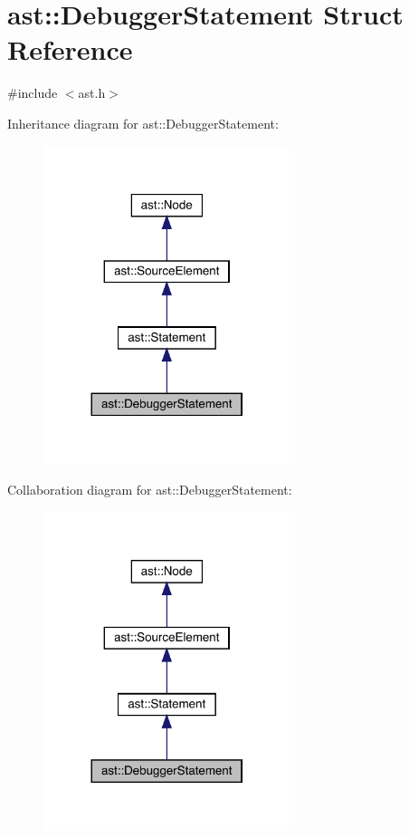 \hypertarget{structast_1_1_debugger_statement}{}\section{ast\+:\+:Debugger\+Statement Struct Reference}
\label{structast_1_1_debugger_statement}


{\ttfamily \#include $<$ast.\+h$>$}



Inheritance diagram for ast\+:\+:Debugger\+Statement\+:
\nopagebreak
\begin{figure}[H]
\begin{center}
\leavevmode
\includegraphics[width=204pt]{structast_1_1_debugger_statement__inherit__graph}
\end{center}
\end{figure}


Collaboration diagram for ast\+:\+:Debugger\+Statement\+:
\nopagebreak
\begin{figure}[H]
\begin{center}
\leavevmode
\includegraphics[width=204pt]{structast_1_1_debugger_statement__coll__graph}
\end{center}
\end{figure}
